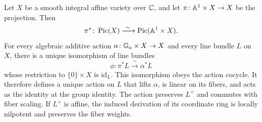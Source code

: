 \begin{proposition}
\label{prop:linearization}
Let $X$ be a smooth integral affine variety over $\mathbb C$, and let
$\pi\colon\mathbb A^1\times X\to X$ be the projection. Then
\[
 \pi^*\colon\operatorname{Pic}(X)\xrightarrow{\ \sim\ }
                  \operatorname{Pic}(\mathbb A^1\times X).
\]
For every algebraic additive action
$\alpha\colon\mathbb G_a\times X\to X$ and every line bundle $L$ on $X$,
there is a unique isomorphism of line bundles
\begin{equation}
\label{bun:linearization-map}
 \phi\colon\pi^*L\xrightarrow{\ \sim\ }\alpha^*L
\end{equation}
whose restriction to $\{0\}\times X$ is $\mathrm{id}_L$.
This isomorphism obeys the action cocycle. It therefore defines a
unique action on $L$ that lifts $\alpha$, is linear on its fibers,
and acts as the identity at the group identity. The action preserves
$L^\times$ and commutes with fiber scaling. If $L^\times$ is affine,
the induced derivation of its coordinate ring is locally nilpotent
and preserves the fiber weights.
\end{proposition}

